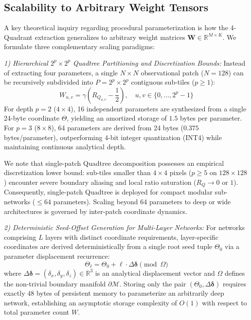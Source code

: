 \documentclass[10pt,journal,compsoc,twocolumn]{article}
\begin{document}
\subsection{Scalability to Arbitrary Weight Tensors}
\label{sec:quadtree}
A key theoretical inquiry regarding procedural parameterization is how the 4-Quadrant extraction generalizes to arbitrary weight matrices $\mathbf{W} \in \mathbb{R}^{M \times K}$. We formulate three complementary scaling paradigms:

\textit{1) Hierarchical $2^p \times 2^p$ Quadtree Partitioning and Discretization Bounds:}
Instead of extracting four parameters, a single $N \times N$ observational patch ($N=128$) can be recursively subdivided into $P = 2^p \times 2^p$ contiguous sub-tiles ($p \ge 1$):
\begin{equation}
W_{u,v} = \gamma \left( R_{Q_{u,v}} - \frac{1}{2} \right), \quad u,v \in \{0, \dots, 2^p-1\}
\end{equation}
For depth $p=2$ ($4 \times 4$), 16 independent parameters are synthesized from a single 24-byte coordinate $\Theta$, yielding an amortized storage of $1.5$ bytes per parameter. For $p=3$ ($8 \times 8$), 64 parameters are derived from 24 bytes ($0.375$ bytes/parameter), outperforming 4-bit integer quantization (INT4) while maintaining continuous analytical depth. 

We note that single-patch Quadtree decomposition possesses an empirical discretization lower bound: sub-tiles smaller than $4 \times 4$ pixels ($p \ge 5$ on $128 \times 128$) encounter severe boundary aliasing and local ratio saturation ($R_Q \to 0$ or $1$). Consequently, single-patch Quadtree is deployed for compact modular sub-networks ($\le 64$ parameters). Scaling beyond 64 parameters to deep or wide architectures is governed by inter-patch coordinate dynamics.

\textit{2) Deterministic Seed-Offset Generation for Multi-Layer Networks:}
For networks comprising $L$ layers with distinct coordinate requirements, layer-specific coordinates are derived deterministically from a single root seed tuple $\Theta_0$ via a parameter displacement recurrence:
\begin{equation}
\label{eq:recurrence}
\Theta_\ell = \Theta_0 + \ell \cdot \Delta \boldsymbol{\delta} \pmod{\Omega}
\end{equation}
where $\Delta \boldsymbol{\delta} = (\delta_x, \delta_y, \delta_z) \in \mathbb{R}^3$ is an analytical displacement vector and $\Omega$ defines the non-trivial boundary manifold $\partial \mathcal{M}$. Storing only the pair $(\Theta_0, \Delta \boldsymbol{\delta})$ requires exactly $48$ bytes of persistent memory to parameterize an arbitrarily deep network, establishing an asymptotic storage complexity of $O(1)$ with respect to total parameter count $W$.
\end{document}
